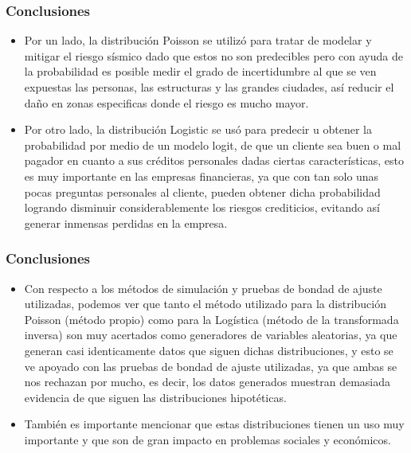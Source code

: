 \documentclass[12pt]{beamer}
\begin{document}

\begin{frame}
\frametitle{Conclusiones}
\begin{itemize}
\item Por un lado, la distribución Poisson se utilizó para tratar de modelar y mitigar el riesgo sísmico dado que estos no son predecibles pero con ayuda de la probabilidad es posible medir el grado de incertidumbre al que se ven expuestas las personas, las estructuras y las grandes ciudades, así reducir el daño en zonas especificas donde el riesgo es mucho mayor. 
\item Por otro lado, la distribución Logistic se usó para predecir u obtener la probabilidad por medio de un modelo logit, de que un cliente sea buen o mal pagador en cuanto a sus créditos personales dadas ciertas características, esto es muy importante en las empresas financieras, ya que con tan solo unas pocas preguntas personales al cliente, pueden obtener dicha probabilidad logrando disminuir considerablemente los riesgos crediticios, evitando así generar inmensas perdidas en la empresa.
\end{itemize}
\end{frame}

\begin{frame}
\frametitle{Conclusiones}
\begin{itemize}
\item Con respecto a los métodos de simulación y pruebas de bondad de ajuste utilizadas, podemos ver que tanto el método utilizado para la distribución Poisson (método propio) como para la Logística (método de la transformada inversa) son muy acertados como generadores de variables aleatorias, ya que generan casi identicamente datos que siguen dichas distribuciones, y esto se ve apoyado con las pruebas de bondad de ajuste utilizadas, ya que ambas se nos rechazan por mucho, es decir, los datos generados muestran demasiada evidencia de que siguen las distribuciones hipotéticas.
\item También es importante mencionar que estas distribuciones tienen un uso muy importante y que son de gran impacto en problemas sociales y económicos. 
\end{itemize}
\end{frame}
\end{document}
